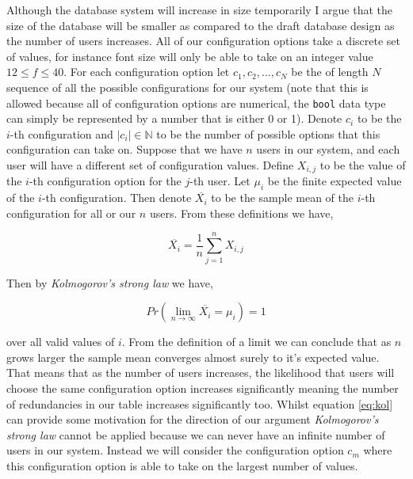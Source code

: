 Although the
database system will increase in size temporarily I argue that
the size of the database will be smaller as compared to the
draft database design as the number of users increases. All of
our configuration options take a discrete set of values, for
instance font size will only be able to take on an integer
value $12 \leq f \leq 40$. For each configuration option let
$c_1, c_2, \ldots, c_N$ be the of length $N$ sequence of all
the possible configurations for our
system (note that this is allowed because all of configuration
options are numerical, the \texttt{bool} data type can simply
be represented by a number that is either 0 or 1). Denote
$c_i$ to be the $i$-th configuration and $|c_i| \in \mathbb{N}$
to be the number of possible options that this configuration
can take on. Suppose that we have $n$ users in our system,
and each user will have a different set of configuration
values.
Define $X_{i, j}$ to be the value of the $i$-th configuration
option for the $j$-th user.
Let $\mu_i$ be the finite expected
value of the $i$-th configuration. Then denote $\overline{X_i}$ to
be the sample mean of the $i$-th configuration for all or our
$n$ users. From these definitions we have,

\begin{equation}
  \overline{X_i} = \frac{1}{n} \sum_{j=1}^n X_{i, j}
\end{equation}

Then by \textit{Kolmogorov's strong law} \cite{thm}
we have,

\begin{equation} \label{eq:kol}
  Pr \left(\lim_{n \to \infty} \overline{X_i} = \mu_i \right) = 1
\end{equation}

over all valid values of $i$. From the definition of a limit
we can conclude that as $n$ grows larger the sample mean
converges almost surely to it's expected value. That means
that as the number of users increases, the likelihood that
users will choose the same configuration option increases
significantly meaning the number of redundancies in our table
increases significantly too. Whilst
equation \ref{eq:kol} can provide some motivation for the
direction of our argument \textit{Kolmogorov's strong law}
cannot be applied because we can never have an infinite number
of users in our system. Instead we will consider the
configuration option $c_m$ where this configuration option is
able to take on the largest number of values.\\ \vspace{0.2cm}

